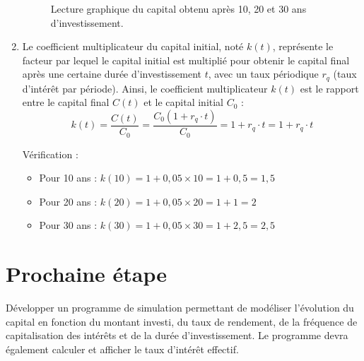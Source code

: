 \documentclass{article}
\begin{document}
\begin{enumerate}[label=\textbf{Q\arabic*.}]
        \begin{figure}[h!]
            \centering
            \caption{Lecture graphique du capital obtenu après 10, 20 et 30 ans d'investissement.}
            \label{fig:lecture_graphique_interets_simples}
        \end{figure}

        \item Le coefficient multiplicateur du capital initial, noté \( k(t) \), représente le facteur par lequel le capital initial est multiplié pour obtenir le capital final après une certaine durée d'investissement \( t \), avec un taux périodique \( r_q \) (taux d'intérêt par période). Ainsi, le coefficient multiplicateur \( k(t) \) est le rapport entre le capital final \( C(t) \) et le capital initial \( C_0 \) :
        \[
        k(t) = \frac{C(t)}{C_0} = \frac{C_0 \left( 1 + r_q \cdot t \right)}{C_0} = 1 + r_q \cdot t = \boxed{1 + r_q \cdot t}
        \]

        Vérification :
        \begin{itemize}
            \item Pour 10 ans : $k(10) = 1 + 0,05 \times 10 = 1 + 0,5 = \boxed{1,5}$
            \item Pour 20 ans : $k(20) = 1 + 0,05 \times 20 = 1 + 1 = \boxed{2}$
            \item Pour 30 ans : $k(30) = 1 + 0,05 \times 30 = 1 + 2,5 = \boxed{2,5}$
        \end{itemize}

    
\end{enumerate}


\section{Prochaine étape}  
Développer un programme de simulation permettant de modéliser l'évolution du capital en fonction du montant investi, du taux de rendement, de la fréquence de capitalisation des intérêts et de la durée d'investissement. Le programme devra également calculer et afficher le taux d'intérêt effectif.  
\end{document}
